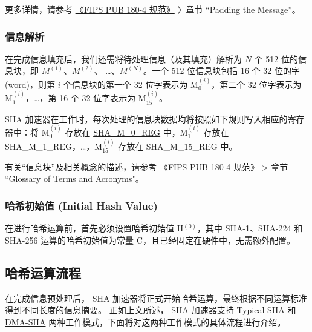 \documentclass[main\_\_CN.tex]{subfiles}
\begin{document}
更多详情，请参考 \href{https://doi.org/10.6028/NIST.FIPS.180-4}{《FIPS PUB 180-4 规范》} 〉章节 “Padding the Message”。

\subsubsection{信息解析}\label{sec:sha-parsingmessage}

在完成信息填充后，我们还需将待处理信息（及其填充）解析为 \begin{math}N\end{math} 个 512 位的信息块，即 \begin{math}M^{(1)}\end{math}、\begin{math}M^{(2)}\end{math}、 \dots、\begin{math}M^{(N)}\end{math}。一个 512 位信息块包括 16 个 32 位的字 (word)，则第 \begin{math}i\end{math} 个信息块的第一个 32 位字表示为 M$^{(i)}_{0}$，第二个 32 位字表示为 M$^{(i)}_{1}$，\dots，第 16 个 32 位字表示为 M$^{(i)}_{15}$。

SHA 加速器在工作时，每次处理的信息块数据均将按照如下规则写入相应的寄存器中：将 M$^{(i)}_{0}$ 存放在 \hyperref[regdesc:SHAMNREG]{SHA\_M\_0\_REG} 中，M$^{(i)}_1$ 存放在 \hyperref[regdesc:SHAMNREG]{SHA\_M\_1\_REG}，\dots，M$^{(i)}_{15}$ 存放在 \hyperref[regdesc:SHAMNREG]{SHA\_M\_15\_REG} 中。

\begin{tiplisting}
有关“信息块”及相关概念的描述，请参考 \href{https://doi.org/10.6028/NIST.FIPS.180-4}{《FIPS PUB 180-4 规范》} > 章节 ``Glossary of Terms and Acronyms"。
\end{tiplisting}

\subsubsection{哈希初始值 (Initial Hash Value)}\label{sec:sha-initialhash}
在进行哈希运算前，首先必须设置哈希初始值 H$^{(0)}$，其中 SHA-1、SHA-224 和 SHA-256 运算的哈希初始值为常量 C，且已经固定在硬件中，无需额外配置。

\subsection{哈希运算流程}\label{sec:sha-hash-operation}

在完成信息预处理后，\chipname{} SHA 加速器将正式开始哈希运算，最终根据不同运算标准得到不同长度的信息摘要。
正如上文所述，\chipname{} SHA 加速器支持 \hyperref[sec:sha-typical-sha]{Typical SHA} 和 \hyperref[sec:sha-dma-sha]{DMA-SHA} 两种工作模式，下面将对这两种工作模式的具体流程进行介绍。
\end{document}
